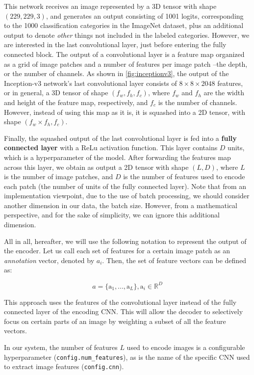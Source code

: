 This network receives an image represented by a 3D tensor with shape $(229, 229, 3)$, and generates an output consisting of 1001 logits, corresponding to the 1000 classification categories in the ImageNet dataset, plus an additional output to denote \textit{other} things not included in the labeled categories. However, we are interested in the last convolutional layer, just before entering the fully connected block. The output of a convolutional layer is a feature map organized as a grid of image patches and a number of features per image patch --the depth, or the number of channels. As shown in \cref{fig:inceptionv3}, the output of the Inception-v3 network's last convolutional layer consists of $8 \times 8 \times 2048$ features, or in general, a 3D tensor of shape $(f_w, f_h, f_c)$, where $f_w$ and $f_h$ are the width and height of the feature map, respectively, and $f_c$ is the number of channels. However, instead of using this map as it is, it is squashed into a 2D tensor, with shape $(f_w \times f_h, f_c)$.

Finally, the squashed output of the last convolutional layer is fed into a \textbf{fully connected layer} with a ReLu activation function. This layer contains  $D$ units, which is a hyperparameter of the model. After forwarding the features map across this layer, we obtain as output a 2D tensor with shape $(L, D)$, where $L$ is the number of image patches, and $D$ is the number of features used to encode each patch (the number of units of the fully connected layer). Note that from an implementation viewpoint, due to the use of batch processing, we should consider another dimension in our data, the batch size. However, from a mathematical perspective, and for the sake of simplicity, we can ignore this additional dimension. 

All in all, hereafter, we will use the following notation to represent the output of the encoder. 
Let us call each set of features for a certain image patch as an \textit{annotation} vector, denoted by $a_i$. Then, the set of feature vectors can be defined as:

$$a = \{\text{a}_1,...,\text{a}_L \}, \text{a}_i \in \mathbb{R}^D$$

This approach uses the features of the convolutional layer instead of the fully connected layer of the encoding CNN. This will allow the decoder to selectively focus on certain parts of an image by weighting a subset of all the feature vectors.

In our system, the number of features $L$ used to encode images is a configurable hyperparameter (\lstinline{config.num_features}), as is the name of the specific CNN used to extract image features (\lstinline{config.cnn}).

